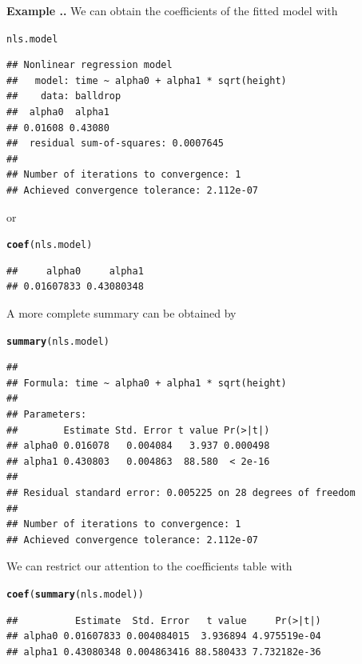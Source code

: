 \documentclass[twoside]{book}\usepackage[]{graphicx}\usepackage[]{xcolor}
\makeatletter
\newcommand{\hlstd}[1]{\textcolor[rgb]{0.345,0.345,0.345}{#1}}%
\newcommand{\hlkwd}[1]{\textcolor[rgb]{0.737,0.353,0.396}{\textbf{#1}}}%
\newenvironment{kframe}{%
 \def\at@end@of@kframe{}%
 \ifinner\ifhmode%
  \def\at@end@of@kframe{\end{minipage}}%
  \begin{minipage}{\columnwidth}%
 \fi\fi%
 \def\FrameCommand##1{\hskip\@totalleftmargin \hskip-\fboxsep
 \colorbox{shadecolor}{##1}\hskip-\fboxsep
     \hskip-\linewidth \hskip-\@totalleftmargin \hskip\columnwidth}%
 \MakeFramed {\advance\hsize-\width
   \@totalleftmargin\z@ \linewidth\hsize
   \@setminipage}}%
 {\par\unskip\endMakeFramed%
 \at@end@of@kframe}
\newenvironment{knitrout}{}{} %
\newcounter{example}[section]
\newenvironment{example}%
{\refstepcounter{example}%
\textbf{Example \thesection.\arabic{example}. }}%
{}
\makeatother
\begin{document}
\begin{example}
	We can obtain the coefficients of the fitted model with
\begin{knitrout}
\color{fgcolor}\begin{kframe}
\begin{alltt}
\hlstd{nls.model}
\end{alltt}
\begin{verbatim}
## Nonlinear regression model
##   model: time ~ alpha0 + alpha1 * sqrt(height)
##    data: balldrop
##  alpha0  alpha1 
## 0.01608 0.43080 
##  residual sum-of-squares: 0.0007645
## 
## Number of iterations to convergence: 1 
## Achieved convergence tolerance: 2.112e-07
\end{verbatim}
\end{kframe}
\end{knitrout}
or
\begin{knitrout}
\color{fgcolor}\begin{kframe}
\begin{alltt}
\hlkwd{coef}\hlstd{(nls.model)}
\end{alltt}
\begin{verbatim}
##     alpha0     alpha1 
## 0.01607833 0.43080348
\end{verbatim}
\end{kframe}
\end{knitrout}
A more complete summary can be obtained by
\begin{knitrout}
\color{fgcolor}\begin{kframe}
\begin{alltt}
\hlkwd{summary}\hlstd{(nls.model)}
\end{alltt}
\begin{verbatim}
## 
## Formula: time ~ alpha0 + alpha1 * sqrt(height)
## 
## Parameters:
##        Estimate Std. Error t value Pr(>|t|)
## alpha0 0.016078   0.004084   3.937 0.000498
## alpha1 0.430803   0.004863  88.580  < 2e-16
## 
## Residual standard error: 0.005225 on 28 degrees of freedom
## 
## Number of iterations to convergence: 1 
## Achieved convergence tolerance: 2.112e-07
\end{verbatim}
\end{kframe}
\end{knitrout}
We can restrict our attention to the coefficients table with
\begin{knitrout}
\color{fgcolor}\begin{kframe}
\begin{alltt}
\hlkwd{coef}\hlstd{(}\hlkwd{summary}\hlstd{(nls.model))}
\end{alltt}
\begin{verbatim}
##          Estimate  Std. Error   t value     Pr(>|t|)
## alpha0 0.01607833 0.004084015  3.936894 4.975519e-04
## alpha1 0.43080348 0.004863416 88.580433 7.732182e-36
\end{verbatim}
\end{kframe}
\end{knitrout}


\end{example}
\end{document}
